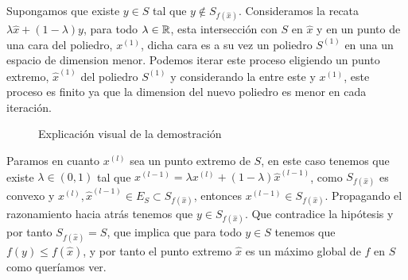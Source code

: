 Supongamos que existe $y \in S$ tal que $y \notin S_{f(\hat{x})}$.
Consideramos la recata $\lambda \hat{x} + (1 - \lambda) y$, para todo $\lambda \in \mathbb{R}$,
esta intersección con $S$ en $\hat{x}$ y en un punto de una cara del poliedro, $x^{(1)}$,
dicha cara es a su vez un poliedro $S^{(1)}$ en una un espacio de dimension menor.
Podemos iterar este proceso eligiendo un punto extremo, $\hat{x}^{(1)}$ del poliedro $S^{(1)}$ y considerando la entre este y $x^{(1)}$,
este proceso es finito ya que la dimension del nuevo poliedro es menor en cada iteración.
\begin{figure}[h!]
\centering
{}
\caption{Explicación visual de la demostración}
\label{fig:prove_schema}
\end{figure}

Paramos en cuanto $x^{(l)}$ sea un punto extremo de $S$,
en este caso tenemos que existe $\lambda \in (0,1)$ tal que $x^{(l - 1)} = \lambda x^{(l)} + (1 - \lambda) \hat{x}^{(l - 1)}$,
como $S_{f(\hat{x})}$ es convexo y $x^{(l)}, \hat{x}^{(l - 1)} \in E_S \subset S_{f(\hat{x})}$,
entonces $x^{(l-1)} \in S_{f(\hat{x})}$.
Propagando el razonamiento hacia atrás tenemos que $y \in S_{f(\hat{x})}$.
Que contradice la hipótesis y por tanto $S_{f(\hat{x})} = S$,
que implica que para todo $y \in S$ tenemos que $f(y) \leq f(\hat{x})$,
y por tanto el punto extremo $\hat{x}$ es un máximo global de $f$ en $S$ como queríamos ver.




